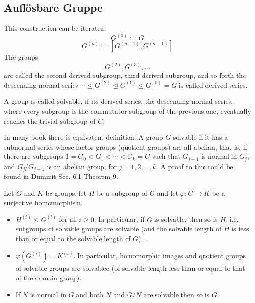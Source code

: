 \subsection{Aufl\"osbare Gruppe}
\begin{definition}
    This construction can be iterated:
    \[G^{(0)}:=G\]
    \[G^{(n)}:=[G^{(n-1)},G^{(n-1)}]\] 
    The groups \[G^(2),G^(3),...\] are called the second derived subgroup, third derived subgroup, and so forth the descending normal series \(\cdots\unlhd G^{(2)}\unlhd G^{(1)}\unlhd G^{(0)} = G\) is called derived series.
\end{definition}

\begin{definition}
    A group is called solvable, if its derived series, the descending normal series, where every subgroup is the commutator subgroup of the previous one, eventually reaches the trivial subgroup of \(G\).
\end{definition}
\begin{remark}
    In many book there is equivatent definition: A group \(G\)  solvable if it has a subnormal series whose factor groups (quotient groups) are all abelian, that is, if there are subgroups $1 = G_0 < G_1 < \cdots < G_k = G$ such that $G_{j-1}$ is normal in $G_j$, and $G_j/G_{j-1}$ is an abelian group, for $j = 1, 2, ..., k$. A proof to this could be found in Dummit Sec. 6.1 Theorem 9.
\end{remark}

\begin{proposition}
    Let \(G\) and \(K\) be groups, let \(H\) be a subgroup of \(G\) and let \(\varphi: G\to K\) be a surjective homomorphism.\begin{itemize}
        \item \(H^{(i)}\leq G^{(i)}\) for all \(i\geq 0\). In particular, if \(G\) is solvable, then so is \(H\), i.e. subgroups of solvable groups are solvable (and the solvable length of $H$ is less than or equal to the solvable length of $G$). .
        \item \(\varphi(G^{(i)}) = K^{(i)}\). In particular, homomorphic images and quotient groups of 
        solvable groups are solvablee (of solvable length less than or equal to that of the 
        domain group).
        \item If \(N\) is normal in \(G\) and both \(N\) and \(G/N\) are solvable then so is \(G\).    
    \end{itemize}
\end{proposition}

